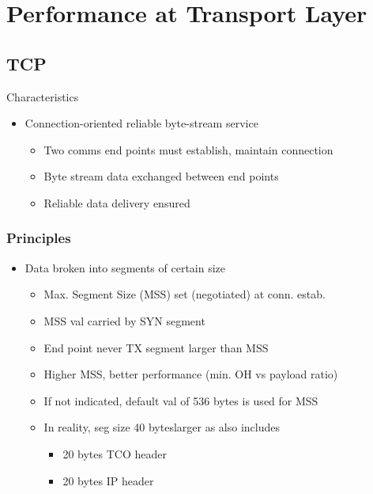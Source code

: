 \documentclass[a4paper]{article}
\begin{document}
\section{Performance at Transport Layer}
\subsection{TCP}
Characteristics
\begin{itemize}
	\item Connection-oriented reliable byte-stream service
	\begin{itemize}
		\item Two comms end points must establish, maintain connection
		\item Byte stream data exchanged between end points
		\item Reliable data delivery ensured
	\end{itemize}
\end{itemize}
\subsubsection{Principles}
\begin{itemize}
	\item Data broken into segments of certain size
	\begin{itemize}
		\item Max. Segment Size (MSS) set (negotiated) at conn. estab.
		\item MSS val carried by SYN segment
		\item End point never TX segment larger than MSS
		\item Higher MSS, better performance (min. OH vs payload ratio)
		\item If not indicated, default val of 536 bytes is used for MSS
		\item In reality, seg size 40 byteslarger as also includes
			\begin{itemize}
				\item 20 bytes TCO header
				\item 20 bytes IP header
			\end{itemize}
	\end{itemize}
\end{itemize}
\end{document}
